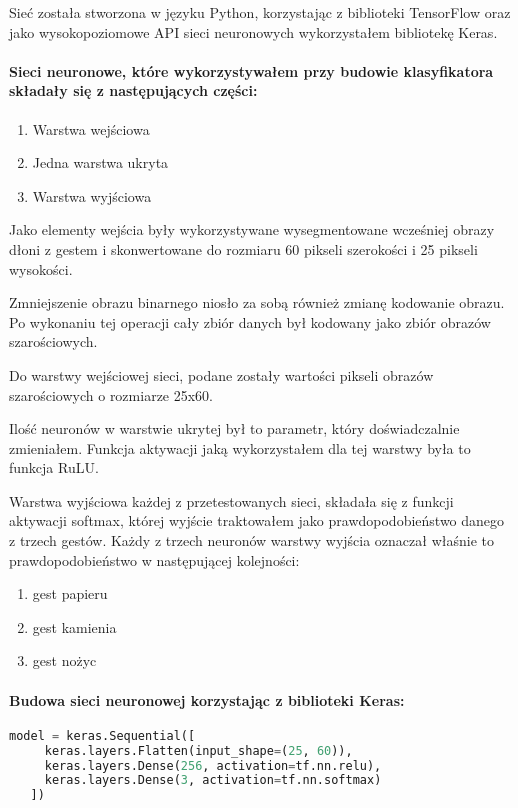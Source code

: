 \documentclass[a4paper,12pt,twoside,openany]{report}
\begin{document}
	Sieć została stworzona w języku Python, korzystając z biblioteki TensorFlow oraz jako wysokopoziomowe API sieci neuronowych wykorzystałem bibliotekę Keras.

	
	\paragraph{Sieci neuronowe, które wykorzystywałem przy budowie klasyfikatora składały się z następujących części:}
	\begin{enumerate}
		\item Warstwa wejściowa
		\item Jedna warstwa ukryta
		\item Warstwa wyjściowa
	\end{enumerate}
	
	Jako elementy wejścia były wykorzystywane wysegmentowane wcześniej obrazy dłoni z gestem i skonwertowane do rozmiaru 60 pikseli szerokości i 25 pikseli wysokości. 
	
	Zmniejszenie obrazu binarnego niosło za sobą również zmianę kodowanie obrazu. Po wykonaniu tej operacji cały zbiór danych był kodowany jako zbiór obrazów szarościowych.
		
	Do warstwy wejściowej sieci, podane zostały wartości pikseli obrazów szarościowych o rozmiarze 25x60. 
	
	Ilość neuronów w warstwie ukrytej był to parametr, który doświadczalnie zmieniałem. Funkcja aktywacji jaką wykorzystałem dla tej warstwy była to funkcja RuLU.

	Warstwa wyjściowa każdej z przetestowanych sieci, składała się z funkcji aktywacji softmax, której wyjście traktowałem jako prawdopodobieństwo danego z trzech gestów. Każdy z trzech neuronów warstwy wyjścia oznaczał właśnie to prawdopodobieństwo w następującej kolejności:
	\begin{enumerate}
		\item gest papieru
		\item gest kamienia
		\item gest nożyc
	\end{enumerate}

	\paragraph{Budowa sieci neuronowej korzystając z biblioteki Keras:}
	\begin{lstlisting}[language=Python]
   model = keras.Sequential([
     keras.layers.Flatten(input_shape=(25, 60)),
     keras.layers.Dense(256, activation=tf.nn.relu),
     keras.layers.Dense(3, activation=tf.nn.softmax)
   ])
	\end{lstlisting}
	
\end{document}
